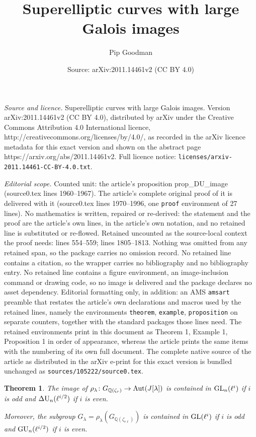 \documentclass[10pt,a4paper]{amsart}
\title{Superelliptic curves with large Galois images}
\author{Pip Goodman}
\date{Source: arXiv:2011.14461v2 (CC BY 4.0)}
\newtheorem{theorem}{Theorem}
\DeclareMathOperator{\Aut}{{\rm Aut}}
\DeclareMathOperator{\DU}{\Delta {\rm U}}
\DeclareMathOperator{\GL}{{\rm GL}}
\newcommand{\GQr}{G_{\QQ(\zeta_{r})}}
\newcommand{\GQrl}{G_{\QQ(\zeta_{r\ell})}}
\DeclareMathOperator{\GU}{{\rm GU}}
\newcommand{\QQ}{\mathbb{Q}}
\begin{document}
\maketitle

\noindent\emph{Source and licence.} Superelliptic curves with large Galois images. Version arXiv:2011.14461v2 (CC BY 4.0), distributed by arXiv under the Creative Commons Attribution 4.0 International licence, http://creativecommons.org/licenses/by/4.0/, as recorded in the arXiv licence metadata for this exact version and shown on the abstract page https://arxiv.org/abs/2011.14461v2. Full licence notice: \texttt{licenses/arxiv-2011.14461-CC-BY-4.0.txt}.\par\smallskip

\noindent\textit{Editorial scope.} Counted unit: the article's proposition prop\_DU\_image (source0.tex lines 1960--1967). The article's complete original proof of it is delivered with it (source0.tex lines 1970--1996, one \texttt{proof} environment of 27 lines). No mathematics is written, repaired or re-derived: the statement and the proof are the article's own lines, in the article's own notation, and no retained line is substituted or re-flowed.  Retained uncounted as the source-local context the proof needs: lines 554--559; lines 1805--1813.  Nothing was omitted from any retained span, so the package carries no omission record.  No retained line contains a citation, so the wrapper carries no bibliography and no bibliography entry.  No retained line contains a figure environment, an image-inclusion command or drawing code, so no image is delivered and the package declares no asset dependency.  Editorial formatting only, in addition: an AMS \texttt{amsart} preamble that restates the article's own declarations and macros used by the retained lines, namely the environments \texttt{theorem}, \texttt{example}, \texttt{proposition} on separate counters, together with the standard packages those lines need.  The retained environments print in this document as Theorem 1, Example 1, Proposition 1 in order of appearance, whereas the article prints the same items with the numbering of its own full document.  The complete native source of the article as distributed in the arXiv e-print for this exact version is bundled unchanged as \texttt{sources/105222/source0.tex}.
\begin{theorem}
\label{thm_containment_of_the_image_of_GQr_and_GQrl}
The image of $\rho_\lambda \colon \GQr \rightarrow \Aut(J[\lambda])$ is contained in $\GL_n(\ell^i)$ if $i$ is odd and $\DU_n(\ell^{i/2})$ if $i$ is even.

Moreover, the subgroup $G_\lambda = \rho_\lambda(\GQrl)$ is contained in $\GL(\ell^i)$ if $i$ is odd and $\GU_n(\ell^{i/2})$ if $i$ is even.
\end{theorem}
\end{document}
